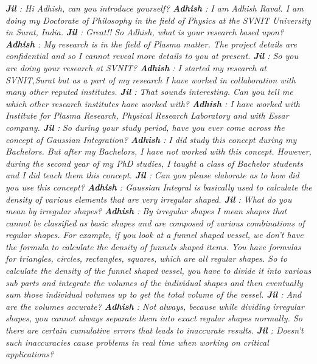 \documentclass{article}
\begin{document}
\textit{\textbf{Jil} : Hi Adhish, can you introduce yourself? \hfill\break
\textbf{Adhish} : I am Adhish Raval. I am doing my Doctorate of Philosophy in the field of Physics at the SVNIT University in Surat, India.\hfill\break
\textbf{Jil} : Great!! So Adhish, what is your research based upon?\hfill\break
\textbf{Adhish} : My research is in the field of Plasma matter. The project details are confidential and so I cannot reveal more details to you at present. \hfill\break
\textbf{Jil} : So you are doing your research at SVNIT? \hfill\break
\textbf{Adhish} : I started my research at SVNIT,Surat but as a part of my research I have worked in collaboration with many other reputed institutes. \hfill\break
\textbf{Jil} : That sounds interesting. Can you tell me which other research institutes have worked with? \hfill\break
\textbf{Adhish} : I have worked with Institute for Plasma Research, Physical Research Laboratory and with Essar company. \hfill\break
\textbf{Jil} : So during your study period, have you ever come across the concept of Gaussian Integration?\hfill\break
\textbf{Adhish} : I did study this concept during my Bachelors. But after my Bachelors, I have not worked with this concept. However, during the second year of my PhD studies, I taught a class of Bachelor students and I did teach them this concept.\hfill\break
\textbf{Jil} : Can you please elaborate as to how did you use this concept? \hfill\break 
\textbf{Adhish} : Gaussian Integral is basically used to calculate the density of various elements that are very irregular shaped.\hfill\break
\textbf{Jil} : What do you mean by irregular shapes?\hfill\break
\textbf{Adhish} : By irregular shapes I mean shapes that cannot be classified as basic shapes and are composed of various combinations of regular shapes. For example, if you look at a funnel shaped vessel, we don't have the formula to calculate the density of funnels shaped items. You have formulas for triangles, circles, rectangles, squares, which are all regular shapes. So to calculate the density of the funnel shaped vessel, you have to divide it into various sub parts and integrate the volumes of the individual shapes and then eventually sum those individual volumes up to get the total volume of the vessel.\hfill\break
\textbf{Jil} : And are the volumes accurate?\hfill\break
\textbf{Adhish} : Not always, because while dividing irregular shapes, you cannot always separate them into exact regular shapes normally. So there are certain cumulative errors that leads to inaccurate results.\hfill\break
\textbf{Jil} : Doesn't such inaccuracies cause problems in real time when working on critical applications?\hfill\break
}
\end{document}

